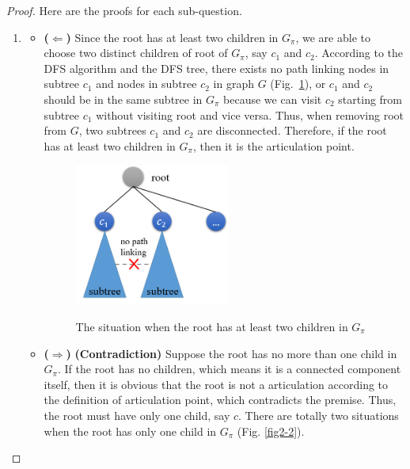 \documentclass[12pt,a4paper]{article}
\theoremstyle{definition}
\begin{document}
\begin{enumerate}
    \begin{proof} Here are the proofs for each sub-question.
    \begin{enumerate}
    \item
        \begin{itemize}
        \item \textbf{($\Longleftarrow$)} Since the root has at least two children in $G_{\pi}$, we are able to choose two distinct children of root of $G_{\pi}$, say $c_1$ and $c_2$. According to the DFS algorithm and the DFS tree, there exists no path linking nodes in subtree $c_1$ and nodes in subtree $c_2$ in graph $G$ (Fig.~\ref{fig2-1}), or $c_1$ and $c_2$ should be in the same subtree in $G_{\pi}$ because we can visit $c_2$ starting from subtree $c_1$ without visiting root and vice versa. Thus, when removing root from $G$, two subtrees $c_1$ and $c_2$ are disconnected. Therefore, if the root has at least two children in $G_{\pi}$, then it is the articulation point.
            \begin{figure}[h]
              \centering
              \includegraphics[width=2in]{figures/prob2-1-1.png}\\
              \caption{The situation when the root has at least two children in $G_{\pi}$}\label{fig2-1}
            \end{figure}
        \item \textbf{($\Longrightarrow$)} \textbf{(Contradiction)} Suppose the root has no more than one child in $G_{\pi}$. If the root has no children, which means it is a connected component itself, then it is obvious that the root is not a articulation according to the definition of articulation point, which contradicts the premise. Thus, the root must have only one child, say $c$. There are totally two situations when the root has only one child in $G_{\pi}$ (Fig. \ref{fig2-2}).
             \begin{figure}[h]
                \centering
\end{figure}
\end{itemize}
\end{enumerate}
\end{proof}
\end{enumerate}
\end{document}
